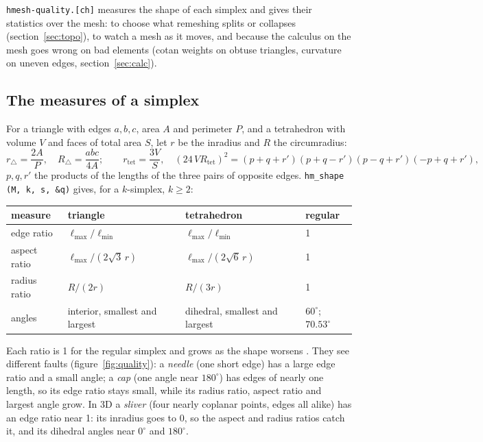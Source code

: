 \documentclass[10pt,a4paper]{article}
\theoremstyle{definition}
\newcommand{\fn}[1]{\texttt{#1}}
\begin{document}
\fn{hmesh-quality.[ch]} measures the shape of each simplex and gives their
statistics over the mesh: to choose what remeshing splits or collapses
(section~\ref{sec:topo}), to watch a mesh as it moves, and because the
calculus on the mesh goes wrong on bad elements (cotan weights on obtuse
triangles, curvature on uneven edges, section~\ref{sec:calc}).

\subsection{The measures of a simplex}

For a triangle with edges $a, b, c$, area $A$ and perimeter $P$, and a
tetrahedron with volume $V$ and faces of total area $S$, let $r$ be the
inradius and $R$ the circumradius:
\[
  r_{\triangle} = \frac{2A}{P}, \quad R_{\triangle} = \frac{abc}{4A};
  \qquad
  r_{\mathrm{tet}} = \frac{3V}{S}, \quad
  (24\, V R_{\mathrm{tet}})^2 = (p+q+r')(p+q-r')(p-q+r')(-p+q+r'),
\]
$p, q, r'$ the products of the lengths of the three pairs of opposite
edges. \fn{hm\_shape (M, k, s, \&q)} gives, for a $k$-simplex, $k \ge 2$:

\begin{center}
\small
\begin{tabular}{@{}l l l l@{}}
  \toprule
  measure & triangle & tetrahedron & regular \\
  \midrule
  edge ratio & $\ell_{\max} / \ell_{\min}$ & $\ell_{\max} / \ell_{\min}$ &
    1 \\
  aspect ratio & $\ell_{\max} / (2\sqrt3\, r)$ & $\ell_{\max} / (2\sqrt6\,
    r)$ & 1 \\
  radius ratio & $R / (2r)$ & $R / (3r)$ & 1 \\
  angles & interior, smallest and largest & dihedral, smallest and
    largest & $60^\circ$; $70.53^\circ$ \\
  \bottomrule
\end{tabular}
\end{center}

Each ratio is 1 for the regular simplex and grows as the shape worsens
\cite{knupp, verdict, freygeorge}. They see different faults
(figure~\ref{fig:quality}): a \emph{needle} (one short edge) has a large
edge ratio and a small angle; a \emph{cap} (one angle near $180^\circ$)
has edges of nearly one length, so its edge ratio stays small, while its
radius ratio, aspect ratio and largest angle grow. In 3D a \emph{sliver}
(four nearly coplanar points, edges all alike) has an edge ratio near 1:
its inradius goes to 0, so the aspect and radius ratios catch it, and
its dihedral angles near $0^\circ$ and $180^\circ$.
\end{document}
